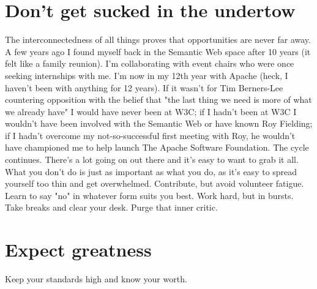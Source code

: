 \section*{Don't get sucked in the undertow}
The interconnectedness of all things proves that opportunities are never far
away. A few years ago I found myself back in the Semantic Web space after 10
years (it felt like a family reunion). I'm collaborating with event chairs who
were once seeking internships with me. I'm now in my 12th year with Apache
(heck, I haven't been with anything for 12 years). If it wasn't for Tim
Berners-Lee countering opposition with the belief that "the last thing we need
is more of what we already have" I would have never been at W3C; if I hadn't
been at W3C I wouldn't have been involved with the Semantic Web or have known
Roy Fielding; if I hadn't overcome my not-so-successful first meeting with Roy,
he wouldn't have championed me to help launch The Apache Software Foundation.
The cycle continues. There's a lot going on out there and it's easy to want to
grab it all. What you don't do is just as important as what you do, as it's easy
to spread yourself too thin and get overwhelmed. Contribute, but avoid volunteer
fatigue. Learn to say "no" in whatever form suits you best. Work hard, but in
bursts. Take breaks and clear your desk. Purge that inner critic.

\section*{Expect greatness}
Keep your standards high and know your worth.
